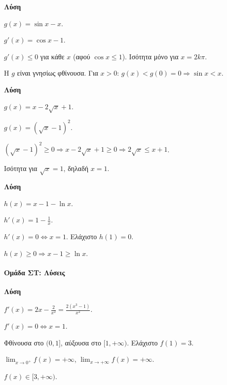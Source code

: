 \documentclass[11pt,a4paper,modern]{FFExercises}
\begin{document}
\askhsh %
\textbf{Λύση}
\begin{alist}
    \item $g(x) = \sin x - x$.
    \item $g'(x) = \cos x - 1$.
    \item $g'(x) \le 0$ για κάθε $x$ (αφού $\cos x \le 1$). Ισότητα μόνο για $x = 2k\pi$.
    \item Η $g$ είναι γνησίως φθίνουσα. Για $x > 0$: $g(x) < g(0) = 0 \Rightarrow \sin x < x$.
\end{alist}

\askhsh %
\textbf{Λύση}
\begin{alist}
    \item $g(x) = x - 2\sqrt{x} + 1$.
    \item $g(x) = (\sqrt{x} - 1)^2$.
    \item $(\sqrt{x} - 1)^2 \ge 0 \Rightarrow x - 2\sqrt{x} + 1 \ge 0 \Rightarrow 2\sqrt{x} \le x + 1$.
    \item Ισότητα για $\sqrt{x} = 1$, δηλαδή $x = 1$.
\end{alist}

\askhsh %
\textbf{Λύση}
\begin{alist}
    \item $h(x) = x - 1 - \ln x$.
    \item $h'(x) = 1 - \frac{1}{x}$.
    \item $h'(x) = 0 \Leftrightarrow x = 1$. Ελάχιστο $h(1) = 0$.
    \item $h(x) \ge 0 \Rightarrow x - 1 \ge \ln x$.
\end{alist}

\paragraph{Ομάδα ΣΤ: Λύσεις}

\askhsh %
\textbf{Λύση}
\begin{alist}
    \item $f'(x) = 2x - \frac{2}{x^2} = \frac{2(x^3 - 1)}{x^2}$.
    \item $f'(x) = 0 \Leftrightarrow x = 1$.
    \item Φθίνουσα στο $(0, 1]$, αύξουσα στο $[1, +\infty)$. Ελάχιστο $f(1) = 3$.
    \item $\lim_{x \to 0^+} f(x) = +\infty$, $\lim_{x \to +\infty} f(x) = +\infty$.
    \item $f(x) \in [3, +\infty)$.
\end{alist}
\end{document}
